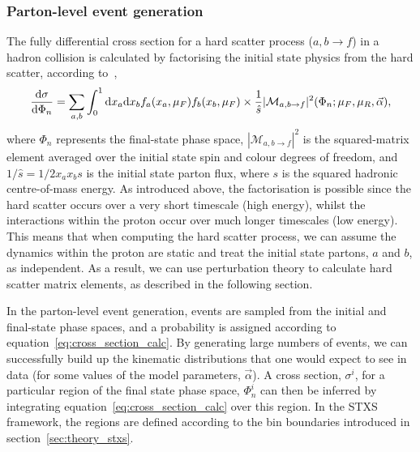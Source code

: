 \subsubsection{Parton-level event generation}
The fully differential cross section for a hard scatter process ($a,b \rightarrow f$) in a hadron collision is calculated by factorising the initial state physics from the hard scatter, according to~\cite{ellis_stirling_webber_1996},
\begin{equation}\label{eq:cross_section_calc}
    \frac{{\rm{d}}\sigma}{{\rm{d}}\Phi_n} = \sum_{a,b} \int^1_0 {\rm{d}}x_a {\rm{d}}x_b f_a(x_a,\mu_F) f_b(x_b,\mu_F) \times \frac{1}{\hat{s}}|\mathcal{M}_{a,b\rightarrow f}|^2(\Phi_n;\mu_F,\mu_R,\vec{\alpha}),
\end{equation}
\noindent
where $\Phi_n$ represents the final-state phase space, $|\mathcal{M}_{a,b\rightarrow f}|^2$ is the squared-matrix element averaged over the initial state spin and colour degrees of freedom, and $1/\hat{s}=1/2x_ax_bs$ is the initial state parton flux, where $s$ is the squared hadronic centre-of-mass energy. As introduced above, the factorisation is possible since the hard scatter occurs over a very short timescale (high energy), whilst the interactions within the proton occur over much longer timescales (low energy). This means that when computing the hard scatter process, we can assume the dynamics within the proton are static and treat the initial state partons, $a$ and $b$, as independent. As a result, we can use perturbation theory to calculate hard scatter matrix elements, as described in the following section.

In the parton-level event generation, events are sampled from the initial and final-state phase spaces, and a probability is assigned according to equation~\ref{eq:cross_section_calc}. By generating large numbers of events, we can successfully build up the kinematic distributions that one would expect to see in data (for some values of the model parameters, $\vec{\alpha}$). A cross section, $\sigma^i$, for a particular region of the final state phase space, $\Phi^i_n$ can then be inferred by integrating equation~\ref{eq:cross_section_calc} over this region. In the STXS framework, the regions are defined according to the bin boundaries introduced in section~\ref{sec:theory_stxs}.

